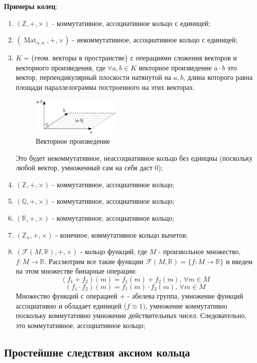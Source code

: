 \documentclass[12pt]{article}
\newcommand{\MR}{\mathbb{R}}
\newcommand{\MQ}{\mathbb{Q}}
\newcommand{\MZ}{\mathbb{Z}}
\newcommand{\MF}{\mathcal{F}}
\theoremstyle{definition}
\newcommand{\mat}[2]{\operatorname{Mat}_{#1, #2}}
\begin{document}
\textbf{Примеры колец}:
\begin{enumerate}[label=\arabic*)]
	\item $(\MZ, +, \times)$ - коммутативное, ассоциативное кольцо с единицей;
	\item $(\mat{n}{n}, +,\times)$ - некоммутативное, ассоциативное кольцо с единицей;
	\item $K = \{\textbf{геом. векторы в пространстве}\}$ с операциями сложения векторов и векторного произведения, где $\forall a,b \in K$ векторное произведение $a{\cdot}b$ это вектор, перпендикулярный плоскости натянутой на $a,b$, длина которого равна площади параллелограмма построенного на этих векторах.
	\begin{figure}[H]
		\centering
		\includegraphics[width=0.4\textwidth]{AL1L11_1.png}
		\caption{Векторное произведение}
		\label{11_1}
	\end{figure}
	Это будет некоммутативное, неассоциативное кольцо без единциы (поскольку любой вектор, умноженный сам на себя даст $0$);
	\item $(\MZ,+,\times)$ - коммутативное, ассоциативное кольцо;
	\item $(\MQ,+,\times)$ - коммутативное, ассоциативное кольцо;
	\item $(\MR, +,\times)$ - коммутативное, ассоциативное кольцо;
	\item $(\MZ_n, +, \times)$ - конечное, коммутативное кольцо вычетов;
	\item $(\MF(M,\MR), +,\times)$ - кольцо функций, где $M$ - произвольное множество, $f \colon M \to \MR$. Рассмотрим все такие функции $\MF(M,\MR) = \{f\colon M \to \MR\}$ и введем на этом множестве бинарные операции:
	$$
		(f_1 + f_2)(m) = f_1(m) + f_2(m), \, \forall m \in M
	$$
	$$
		(f_1{\cdot}f_2)(m) = f_1(m){\cdot}f_2(m), \, \forall m \in M
	$$
	Множество функций с операцией $+$ - абелева группа, умножение функций ассоциативно и обладает единицей ($f\equiv 1)$, умножение коммутативно поскольку коммутативно умножение действительных чисел. Следовательно, это коммутативное, ассоциативное кольцо;
\end{enumerate}
\newpage
\subsection*{Простейшие следствия аксиом кольца}
\end{document}
